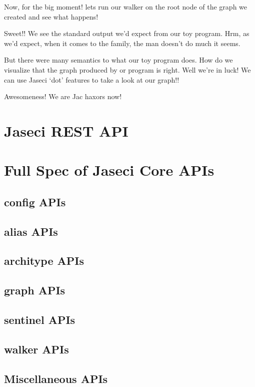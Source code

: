 \par
Now, for the big moment! lets run our walker on the root node of the graph we created and see what happens!
\par
{}
\par
Sweet!! We see the standard output we'd expect from our toy program. Hrm, as we'd expect, when it comes to the family, the man doesn't do much it seems. 
\par
But there were many semantics to what our toy program does. How do we visualize that the graph produced by or program is right. Well we're in luck! We can use Jaseci `dot' features to take a look at our graph!!
\par
{}
\par
Awesomeness! We are Jac \Gls{haxor}s now!

\section{Jaseci REST API}

\section{Full Spec of Jaseci Core APIs}
\subsection{config APIs}
\subsection{alias APIs}
\subsection{architype APIs}
\subsection{graph APIs}
\subsection{sentinel APIs}
\subsection{walker APIs}
\subsection{Miscellaneous APIs}